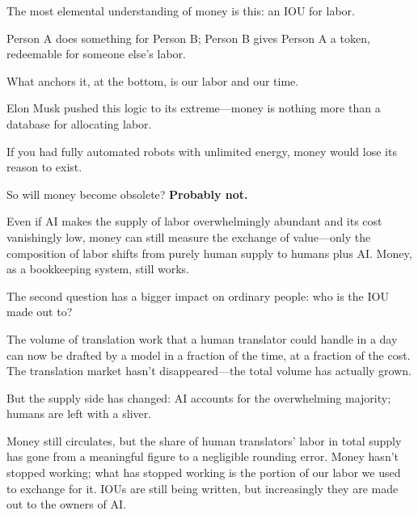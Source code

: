 


The most elemental understanding of money is this: an IOU for labor.

Person A does something for Person B; Person B gives Person A a token, redeemable for someone else's labor.

What anchors it, at the bottom, is our labor and our time.

Elon Musk pushed this logic to its extreme---money is nothing more than a database for allocating labor.

If you had fully automated robots with unlimited energy, money would lose its reason to exist.

\vspace{1em}

So will money become obsolete? \textbf{Probably not.}

Even if AI makes the supply of labor overwhelmingly abundant and its cost vanishingly low, money can still measure the exchange of value---only the composition of labor shifts from purely human supply to humans plus AI.
Money, as a bookkeeping system, still works.

\vspace{1em}

The second question has a bigger impact on ordinary people: who is the IOU made out to?

The volume of translation work that a human translator could handle in a day can now be drafted by a model in a fraction of the time, at a fraction of the cost. The translation market hasn't disappeared---the total volume has actually grown.

But the supply side has changed: AI accounts for the overwhelming majority; humans are left with a sliver.

\vspace{1em}

Money still circulates, but the share of human translators' labor in total supply has gone from a meaningful figure to a negligible rounding error.
Money hasn't stopped working; what has stopped working is the portion of our labor we used to exchange for it.
IOUs are still being written, but increasingly they are made out to the owners of AI.

